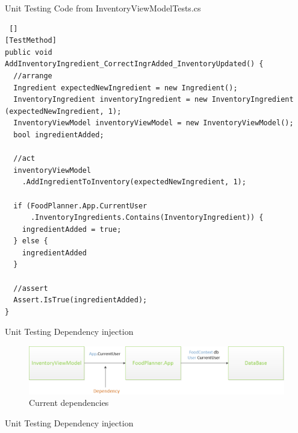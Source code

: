 \begin{frame} [fragile] {Unit Testing} {Code from InventoryViewModelTests.cs}

\begin{lstlisting} []
[TestMethod]
public void
AddInventoryIngredient_CorrectIngrAdded_InventoryUpdated() {
  //arrange
  Ingredient expectedNewIngredient = new Ingredient();
  InventoryIngredient inventoryIngredient = new InventoryIngredient (expectedNewIngredient, 1);
  InventoryViewModel inventoryViewModel = new InventoryViewModel();
  bool ingredientAdded;
  
  //act
  inventoryViewModel
    .AddIngredientToInventory(expectedNewIngredient, 1);
  
  if (FoodPlanner.App.CurrentUser
      .InventoryIngredients.Contains(InventoryIngredient)) {
    ingredientAdded = true;
  } else {
    ingredientAdded
  }
    
  //assert
  Assert.IsTrue(ingredientAdded);
}
\end{lstlisting}

\end{frame}

\begin{frame} {Unit Testing} {Dependency injection}

\begin{figure}
\includegraphics[width = \textwidth] {graphics/currentDependency.png}
\caption{Current dependencies}
\end{figure}
\end{frame}

\begin{frame} {Unit Testing} {Dependency injection}

\end{frame}